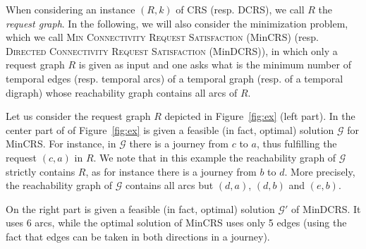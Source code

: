 \documentclass[11pt]{article}%
\begin{document}
    When considering an instance $(R,k)$ of CRS (resp. DCRS), we call $R$ the {\it request graph}. In the following, we will also consider the minimization problem, which we call \textsc{Min Connectivity Request Satisfaction} (MinCRS) (resp. \textsc{Directed Connectivity Request Satisfaction} (MinDCRS)), in which only a request graph $R$ is given as input and one asks what is the minimum number of temporal edges (resp. temporal arcs) of a temporal graph (resp. of a temporal digraph) whose reachability graph contains all arcs of $R$. %

    \begin{example}\label{ex:example}
    Let us consider the request graph $R$ depicted in Figure~\ref{fig:ex} (left part). In the center part of of Figure~\ref{fig:ex} is given a feasible (in fact, optimal) solution $\mathcal G$ for MinCRS. For instance, in $\mathcal G$ there is a journey from $c$ to $a$, thus fulfilling the request $(c,a)$ in $R$. We note that in this example the reachability graph of $\mathcal G$ strictly contains $R$, as for instance there is a journey from $b$ to $d$. More precisely, the reachability graph of $\mathcal G$ contains all arcs but $(d,a)$, $(d,b)$ and $(e,b)$.
    
    On the right part is given a feasible (in fact, optimal) solution $\mathcal G'$ of MinDCRS. It uses 6 arcs, while the optimal solution of MinCRS uses only 5 edges (using the fact that edges can be taken in both directions in a journey).
    


    \begin{figure}[!ht]
      \centering
\end{figure}
\end{example}
\end{document}
